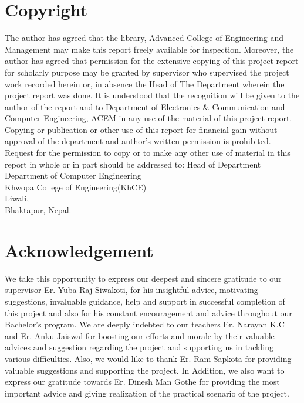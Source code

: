			\chapter*{Copyright}
		\normalsize
		\justify
		The author has agreed that the library, Advanced College of Engineering and
Management may make this report freely available for inspection. Moreover, the author
has agreed that permission for the extensive copying of this project report for scholarly
purpose may be granted by supervisor who supervised the project work recorded herein
or, in absence the Head of The Department wherein the project report was done. It is
understood that the recognition will be given to the author of the report and to
Department of Electronics & Communication and Computer Engineering, ACEM in
any use of the material of this project report. Copying or publication or other use of this
report for financial gain without approval of the department and author’s written
permission is prohibited. Request for the permission to copy or to make any other use
of material in this report in whole or in part should be addressed to:
Head of Department\\
\vspace{1.5cm}
Department of Computer Engineering\\
Khwopa College of Engineering(KhCE)\\
Liwali,\\
Bhaktapur, Nepal.\\
		\break

	
		\large
			\chapter*{Acknowledgement}
		\normalsize
		\justify
			We take this opportunity to express our deepest and sincere gratitude to our supervisor
Er. Yuba Raj Siwakoti, for his insightful advice, motivating suggestions, invaluable
guidance, help and support in successful completion of this project and also for his
constant encouragement and advice throughout our Bachelor’s program.
We are deeply indebted to our teachers Er. Narayan K.C and Er. Anku Jaiswal for
boosting our efforts and morale by their valuable advices and suggestion regarding the
project and supporting us in tackling various difficulties.
Also, we would like to thank Er. Ram Sapkota for providing valuable suggestions and
supporting the project.
In Addition, we also want to express our gratitude towards Er. Dinesh Man Gothe for
providing the most important advice and giving realization of the practical scenario of
the project.\\


